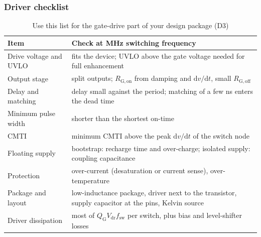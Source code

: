 \begin{frame}
	\frametitle{Driver checklist}
	\begin{table}
		\centering
		\footnotesize
		\begin{tabular}{|>{\raggedright\arraybackslash}p{3.6cm}|>{\raggedright\arraybackslash}p{9.6cm}|}
			\hline
			\textbf{Item}                     & \textbf{Check at MHz switching frequency}                                                                \\
			\hline
			Drive voltage and UVLO            & fits the device; UVLO above the gate voltage needed for full enhancement                                 \\
			Output stage                      & split outputs; $R_\mathrm{G,on}$ from damping and $\mathrm{d}v/\mathrm{d}t$, small $R_\mathrm{G,off}$     \\
			Delay and matching                & delay small against the period; matching of a few ns enters the dead time                               \\
			Minimum pulse width               & shorter than the shortest on-time                                                                       \\
			CMTI                              & minimum CMTI above the peak $\mathrm{d}v/\mathrm{d}t$ of the switch node                                  \\
			Floating supply                   & bootstrap: recharge time and over-charge; isolated supply: coupling capacitance                         \\
			Protection                        & over-current (desaturation or current sense), over-temperature                                           \\
			Package and layout                & low-inductance package, driver next to the transistor, supply capacitor at the pins, Kelvin source      \\
			Driver dissipation                & most of $Q_\mathrm{G}V_\mathrm{dr}f_\mathrm{sw}$ per switch, plus bias and level-shifter losses           \\
			\hline
		\end{tabular}
		\caption{Use this list for the gate-drive part of your design package (D3)}
	\end{table}
\end{frame}

